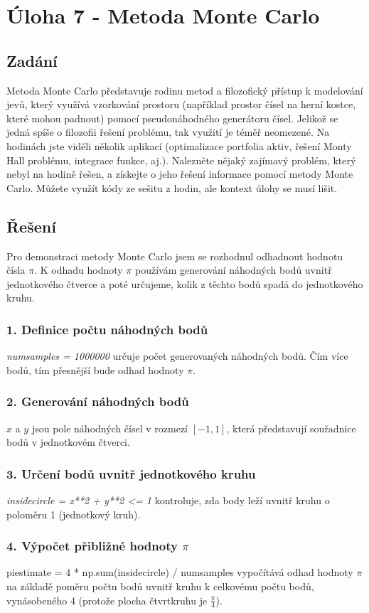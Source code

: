 \documentclass[a4paper,12pt]{article}
\begin{document}
	\section {Úloha 7 - Metoda Monte Carlo}
	\subsection{Zadání}
Metoda Monte Carlo představuje rodinu metod a filozofický přístup k modelování jevů, který využívá vzorkování prostoru (například prostor čísel na herní kostce, které mohou padnout) pomocí pseudonáhodného generátoru čísel. Jelikož se jedná spíše o filozofii řešení problému, tak využití je téměř neomezené. Na hodinách jste viděli několik aplikací (optimalizace portfolia aktiv, řešení Monty Hall problému, integrace funkce, aj.). Nalezněte nějaký zajímavý problém, který nebyl na hodině řešen, a získejte o jeho řešení informace pomocí metody Monte Carlo. Můžete využít kódy ze sešitu z hodin, ale kontext úlohy se musí lišit. 

\subsection{Řešení}
Pro demonstraci metody Monte Carlo jsem se rozhodnul odhadnout hodnotu čísla $\pi$. K odhadu hodnoty $\pi$ používám generování náhodných bodů uvnitř jednotkového čtverce a poté určujeme, kolik z těchto bodů spadá do jednotkového kruhu.
\subsubsection{1. Definice počtu náhodných bodů}
\textit{num{\textunderscore}samples = 1000000} určuje počet generovaných náhodných bodů. Čím více bodů, tím přesnější bude odhad hodnoty $\pi$.
\subsubsection{2. Generování náhodných bodů}
$x$ a $y$ jsou pole náhodných čísel v rozmezí $[-1, 1]$, která představují souřadnice bodů v jednotkovém čtverci.
\subsubsection{3. Určení bodů uvnitř jednotkového kruhu}
\textit{inside{\textunderscore}circle = x**2 + y**2 <= 1} kontroluje, zda body leží uvnitř kruhu o poloměru 1 (jednotkový kruh).
\subsubsection{4. Výpočet přibližné hodnoty $\pi$}
pi{\textunderscore}estimate = 4 * np.sum(inside{\textunderscore}circle) / num{\textunderscore}samples vypočítává odhad hodnoty $\pi$ na základě poměru počtu bodů uvnitř kruhu k celkovému počtu bodů, vynásobeného 4 (protože plocha čtvrtkruhu je $\frac{\pi}{4}$).

	
\end{document}

